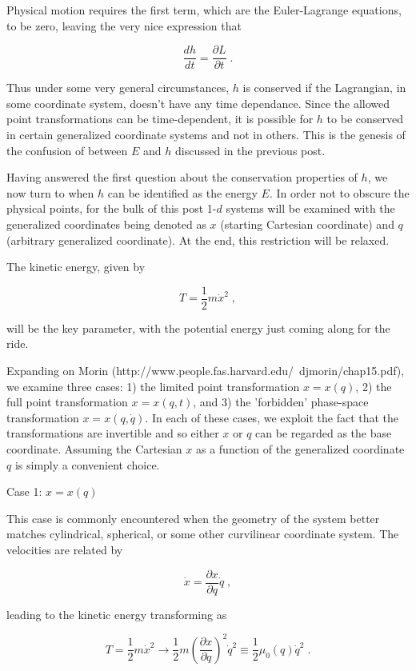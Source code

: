 \documentclass[12pt]{article}
\begin{document}
Physical motion requires the first term, which are the Euler-Lagrange equations, to be zero, leaving the very nice expression that 

\[ \frac{d h}{dt} = \frac{\partial L}{\partial t} \; . \]

Thus under some very general circumstances, $h$ is conserved if the Lagrangian, in some coordinate system, doesn't have any time dependance.  Since the allowed point transformations can be time-dependent, it is possible for $h$ to be conserved in certain generalized coordinate systems and not in others.  This is the genesis of the confusion of between $E$ and $h$ discussed in the previous post.
 
Having answered the first question about the conservation properties of $h$, we now turn to when $h$ can be identified as the energy $E$.  In order not to obscure the physical points, for the bulk of this post 1-$d$ systems will be examined with the generalized coordinates being denoted as $x$ (starting Cartesian coordinate) and $q$ (arbitrary generalized coordinate).  At the end, this restriction will be relaxed.

The kinetic energy, given by

\[ T = \frac{1}{2} m {\dot x}^2 \; ,\]

will be the key parameter, with the potential energy just coming along for the ride.

Expanding on Morin (http://www.people.fas.harvard.edu/~djmorin/chap15.pdf), we examine three cases: 1) the limited point transformation $x = x(q)$, 2) the full point transformation $x = x(q,t)$, and 3) the 'forbidden' phase-space transformation $x=x(q,{\dot q})$.  In each of these cases, we exploit the fact that the transformations are invertible and so either $x$ or $q$ can be regarded as the base coordinate.  Assuming the Cartesian $x$ as a function of the generalized coordinate $q$ is simply a convenient choice.

Case 1: $x = x(q)$

This case is commonly encountered when the geometry of the system better matches cylindrical, spherical, or some other curvilinear coordinate system.  The velocities are related by

\[ {\dot x} =  \frac{\partial x}{\partial q} {\dot q} \; , \]

leading to the kinetic energy transforming as 
 
\[ T = \frac{1}{2} m {\dot x}^2 \rightarrow \frac{1}{2} m \left( \frac{\partial x}{\partial q} \right)^2 {\dot q}^2 \equiv \frac{1}{2} \mu_0(q) {\dot q}^2 \; .\]
\end{document}
